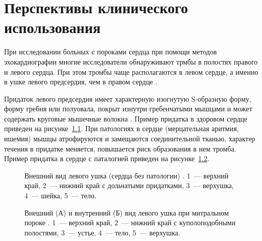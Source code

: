 \chapter{Перспективы клинического использования}
\label{chapter:perspectives} 

При исследовании больных с пороками сердца при помощи методов эхокардиографии многие исследователи обнаруживают трмбы в
полостях правого и левого сердца.
При этом тромбы чаще располагаются в левом сердце, а именно в ушке левого предсердия, чем в правом сердце
\cite{ikorkin2018diagnosis, agmon2002clinical, castello1990prevalence, pollick1991assesmentlaa}.

Придаток левого предсердия имеет характерную изогнутую S-образную форму, форму гребня или полуовала,
покрыт изнутри гребенчатыми мышцами и может содержать круговые мышечные волокна \cite{stepanchuk2012appendage}.
Пример придатка в здоровом сердце приведен на рисунке~\ref{fig:normal_laa}.
При патологиях в сердце (мерцательная аритмия, ишемия) мышцы атрофируются и замещаются соединительной тканью,
характер течения в придатке меняется, повышается риск образования в нем тромба.
Пример придатка в сердце с паталогией приведен на рисунке~\ref{fig:pathologic_laa}.

\begin{figure}[ht!]
    \begin{center}
        \hspace{8pt}
    \end{center}
    \caption{Внешний вид левого ушка (сердца без патологии) \cite{stepanchuk2012appendage}.
    1~--- верхний край, 2~--- нижний край с дольчатыми придатками, 3~--- верхушка, 4~--- шейка, 5~--- тело.}
    \label{fig:normal_laa}
\end{figure}


\begin{figure}[ht!]
    \begin{center}
        \hspace{8pt}
    \end{center}
    \caption{Внешний (А) и внутренний (Б) вид левого ушка при митральном пороке \cite{stepanchuk2012appendage}.
    1~--- верхний край, 2~--- нижний край с куполоподобными полостями, 3~--- устье, 4~--- тело, 5~--- верхушка.}
    \label{fig:pathologic_laa}
\end{figure}

